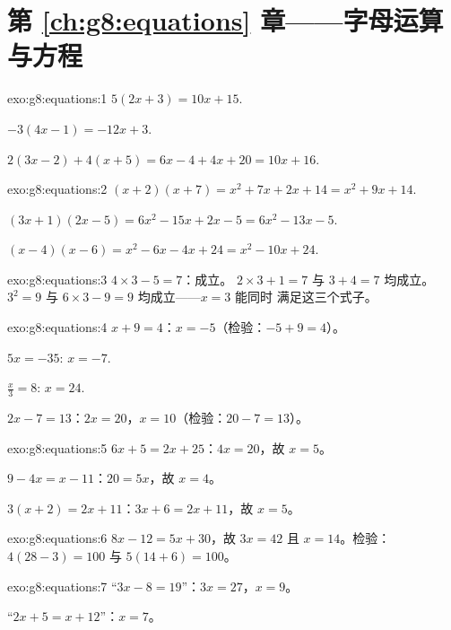 \section*{第 \ref{ch:g8:equations} 章——字母运算与方程}

\begin{solution}{exo:g8:equations:1}
$5(2x + 3) = 10x + 15$.

$-3(4x - 1) = -12x + 3$.

$2(3x - 2) + 4(x + 5) = 6x - 4 + 4x + 20 = 10x + 16$.
\end{solution}

\begin{solution}{exo:g8:equations:2}
$(x+2)(x+7) = x^2 + 7x + 2x + 14 = x^2 + 9x + 14$.

$(3x+1)(2x-5) = 6x^2 - 15x + 2x - 5 = 6x^2 - 13x - 5$.

$(x-4)(x-6) = x^2 - 6x - 4x + 24 = x^2 - 10x + 24$.
\end{solution}

\begin{solution}{exo:g8:equations:3}
$4 \times 3 - 5 = 7$：成立。 \quad
$2 \times 3 + 1 = 7$ 与 $3 + 4 = 7$ 均成立。 \quad
$3^2 = 9$ 与 $6 \times 3 - 9 = 9$ 均成立——$x = 3$ 能同时
满足这三个式子。
\end{solution}

\begin{solution}{exo:g8:equations:4}
$x + 9 = 4$：$x = -5$（检验：$-5 + 9 = 4$）。

$5x = -35$: $x = -7$.

$\frac x3 = 8$: $x = 24$.

$2x - 7 = 13$：$2x = 20$，$x = 10$（检验：$20 - 7 = 13$）。
\end{solution}

\begin{solution}{exo:g8:equations:5}
$6x + 5 = 2x + 25$：$4x = 20$，故 $x = 5$。

$9 - 4x = x - 11$：$20 = 5x$，故 $x = 4$。

$3(x + 2) = 2x + 11$：$3x + 6 = 2x + 11$，故 $x = 5$。
\end{solution}

\begin{solution}{exo:g8:equations:6}
$8x - 12 = 5x + 30$，故 $3x = 42$ 且 $x = 14$。检验：
$4(28 - 3) = 100$ 与 $5(14 + 6) = 100$。
\end{solution}

\begin{solution}{exo:g8:equations:7}
“$3x - 8 = 19$”：$3x = 27$，$x = 9$。

“$2x + 5 = x + 12$”：$x = 7$。
\end{solution}

